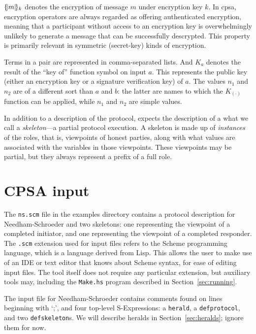 $\{\!|m|\!\}_{k}$ denotes the encryption of message $m$ under encryption
key $k$.  In {cpsa}, encryption operators are always regarded as
offering authenticated encryption, meaning that a participant without
access to an encryption key is overwhelmingly unlikely to generate a
message that can be successfully descrypted.  This property is
primarily relevant in symmetric (secret-key) kinds of encryption.  

Terms in a pair are represented in comma-separated lists.  And $K_a$
denotes the result of the ``key of'' function symbol on input $a$.
This represents the public key (either an encryption key or a
signature verification key) of $a$.  The values $n_1$ and $n_2$ are of
a different sort than $a$ and $b$: the latter are names to which the
$K_{(\cdot)}$ function can be applied, while $n_1$ and $n_2$ are
simple values.

In addition to a description of the protocol, {\cpsa} expects the
description of a what we call a \emph{skeleton}---a partial protocol
execution.  A skeleton is made up of \emph{instances} of the roles, that is,
viewpoints of honest parties, along with what values are associated with the
variables in those viewpoints.  These viewpoints may be partial, but they
always represent a prefix of a full role.

\section{CPSA input}

 The \texttt{ns.scm} file in the examples
directory contains a protocol description for Needham-Schroeder and
two skeletons: one representing the viewpoint of a completed
initiator, and one representing the viewpoint of a completed
responder.  The \texttt{.scm} extension used for {\cpsa} input files
refers to the Scheme programming language, which is a language derived
from Lisp.  This allows the user to make use of an IDE or text editor
that knows about Scheme syntax, for ease of editing input files.  The
{\cpsa} tool itself does not require any particular extension, but
auxiliary tools may, including the \texttt{Make.hs} program described
in Section~\ref{sec:running}.

  The input file for
Needham-Schroeder contains comments found on lines beginning with `;',
and four top-level S-Expressions: a \texttt{herald}, a \texttt{defprotocol},
and two \texttt{defskeleton}s.  We will describe heralds in
Section~\ref{sec:heralds}; ignore them for now.

